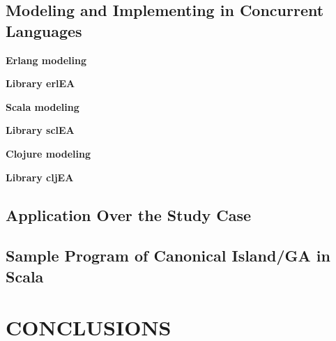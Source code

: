 \documentclass[a4paper,twoside]{article}
\newcommand{\simpleEntry}[1]{
\vspace{.3cm}
\noindent \textbf{#1}
\vspace{.3cm}
}
\begin{document}
\subsection{Modeling and Implementing in Concurrent Languages}
\label{sec:impl}
    

\simpleEntry{Erlang modeling}
    

\simpleEntry{Library erlEA}
    

\simpleEntry{Scala modeling}
    

\simpleEntry{Library sclEA}
    

\simpleEntry{Clojure modeling}
    

\simpleEntry{Library cljEA}
    

\subsection{Application Over the Study Case} \label{sec:results}%
    

\subsection{Sample Program of Canonical Island/GA in Scala}\label{sec:sample}


\section{\uppercase{Conclusions}}
\label{sec:conclusions}
    


%


%
%

\vfill

{\small
}
\end{document}
